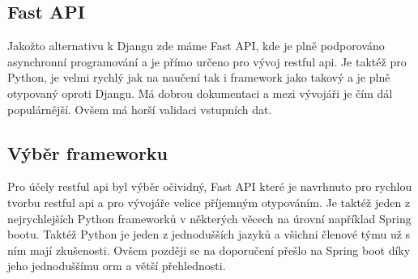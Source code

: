 \subsection{Fast API}\label{sec:api_technologies:fast}
Jakožto alternativu k Djangu zde máme Fast API, kde je plně podporováno asynchronní programování a je přímo určeno pro vývoj \gls{restful api}. Je taktéž pro Python, je velmi rychlý jak na naučení tak i framework jako takový a je plně otypovaný oproti Djangu. Má dobrou dokumentaci a mezi vývojáři je čím dál populárnější. Ovšem má horší validaci vstupních dat.


\subsection{Výběr frameworku}\label{sec:api_technologies:summary}
Pro účely \gls{restful api} byl výběr očividný, Fast API které je navrhnuto pro rychlou tvorbu \gls{restful api} a pro vývojáře velice příjemným otypováním. Je taktéž jeden z nejrychlejších Python frameworků v některých věcech na úrovní například Spring bootu.\cite{benchmarks} Taktéž Python je jeden z jednodušších jazyků a všichni členové týmu už s ním mají zkušenosti. Ovšem později se na doporučení přešlo na Spring boot díky jeho jednoduššímu \gls{orm} a větší přehlednosti.